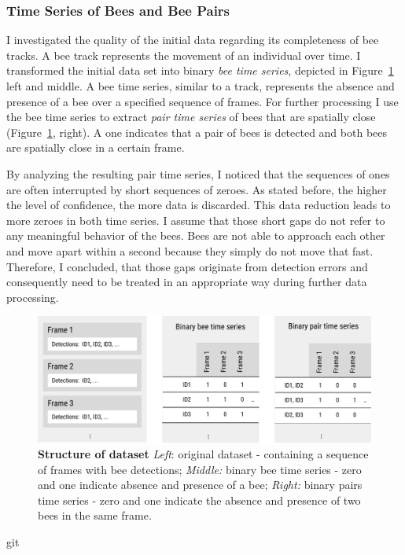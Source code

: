 \subsubsection{Time Series of Bees and Bee Pairs}
\label{subsec:tracking}
I investigated the quality of the initial data regarding its completeness of bee tracks.
A bee track represents the movement of an individual over time.
I transformed the initial data set into binary \emph{bee time series}, depicted in Figure~\ref{fig:structure} left and middle.
A bee time series, similar to a track, represents the absence and presence of a bee over a specified sequence of frames.
For further processing I use the bee time series to extract \emph{pair time series} of bees that are spatially close (Figure~\ref{fig:structure}, right).
A one indicates that a pair of bees is detected and both bees are spatially close in a certain frame.


By analyzing the resulting pair time series, I noticed that the sequences of ones are often interrupted by short sequences of zeroes.
As stated before, the higher the level of confidence, the more data is discarded.
This data reduction leads to more zeroes in both time series.
I assume that those short gaps do not refer to any meaningful behavior of the bees. Bees are not able to approach each other and move apart within a second because they simply do not move that fast.
Therefore, I concluded, that those gaps originate from detection errors and consequently need to be treated in an appropriate way during further data processing.

\begin{figure}[htb]
	\centering
	\includegraphics[width=1.0\textwidth]{Figures/structure}
	\caption[Structure of dataset]{\textbf{Structure of dataset} \emph{Left}: original dataset - containing a sequence of frames with bee detections; \emph{Middle:} binary bee time series - zero and one indicate absence and presence of a bee; \emph{Right:} binary pairs time series - zero and one indicate the absence and presence of two bees in the same frame.}
	\label{fig:structure}
\end{figure}git